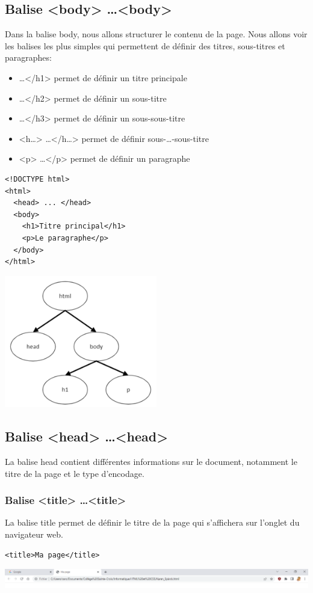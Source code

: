 \documentclass[a4paper,11pt]{article}
\begin{document}
\subsection{Balise <body> \dots <body>}
Dans la balise body, nous allons structurer le contenu de la page. Nous allons voir les balises les plus simples qui permettent de définir des titres, sous-titres et paragraphes:
\begin{itemize}
\item <h1> \dots </h1>  permet de définir un titre principale
\item <h2> \dots </h2>  permet de définir un sous-titre
\item <h3> \dots </h3>  permet de définir un sous-sous-titre
\item <h\dots> \dots </h\dots>  permet de définir  sous-\dots-sous-titre
\item  <p> \dots </p>  permet de définir un paragraphe
\end{itemize}
\begin{multicols}{2}
\begin{lstlisting}
<!DOCTYPE html>
<html>
  <head> ... </head>
  <body>
    <h1>Titre principal</h1>
    <p>Le paragraphe</p>
  </body>
</html>
\end{lstlisting}
\includegraphics[width=0.5\textwidth]{images/baliseBody.png} \\
\end{multicols}

\subsection{Balise <head> \dots <head>}
La balise head contient différentes informations sur le document, notamment le titre de la page et le type d'encodage.

\subsubsection{Balise <title> \dots <title>}
La balise title permet de définir le titre de la page qui s'affichera sur l'onglet du navigateur web.
\begin{lstlisting}
<title>Ma page</title>
\end{lstlisting}
\includegraphics[width=1.0\textwidth]{images/Titre.png}
\end{document}
